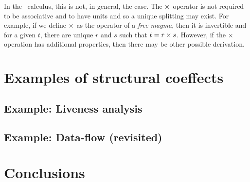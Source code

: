 In the \clstr~calculus, this is not, in general, the case. The $\times$ operator is not required 
to be associative and to have units and so a unique splitting may exist.  For example, if we
define $\times$ as the operator of a \emph{free magma}, then it is invertible and for a given
$t$, there are unique $r$ and $s$ such that $t = r \times s$. However, if the $\times$ operation 
has additional properties, then there may be other possible derivation.


\section{Examples of structural coeffects}

\subsection{Example: Liveness analysis}
\label{sec:structural-neededness}

\subsection{Example: Data-flow (revisited) }
\label{sec:structural-tainting}

  
\section{Conclusions}

